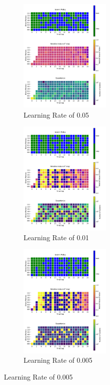\documentclass[a4paper]{article}
\begin{document}
\begin{figure}[ht]
    \centering
    \begin{subfigure}[b]{0.24\textwidth}
        \centering
        \includegraphics[width=12em]{../figures/policy_b3_lr05.pdf}
        \caption{Learning Rate of 0.05}
        \label{b3_lr05}
    \end{subfigure}
    \begin{subfigure}[b]{0.24\textwidth}
        \centering
        \includegraphics[width=12em]{../figures/policy_b3_lr01.pdf}
        \caption{Learning Rate of 0.01}
        \label{b3_lr01}
    \end{subfigure}
    \begin{subfigure}[b]{0.24\textwidth}
        \centering
        \includegraphics[width=12em]{../figures/policy_b3_lr005.pdf}
        \caption{Learning Rate of 0.005}
        \label{b3_lr005}
    \end{subfigure}

\end{figure}
\end{document}
